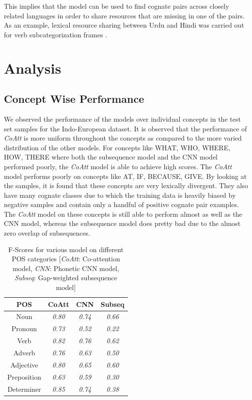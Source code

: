 \documentclass[11pt,letterpaper]{article}
\begin{document}
This implies that the model can be used to find cognate pairs across closely related languages in order to share resources that are missing in one of the pairs. As an example, lexical resource sharing between Urdu and Hindi was carried out for verb subcategorization frames \cite{bhat-EtAl:2014:LT4CloseLang}.

\section{Analysis}

\subsection{Concept Wise Performance}

We observed the performance of the models over individual concepts in the test set samples for the Indo-European dataset. It is observed that the performance of \textit{CoAtt} is more uniform throughout the concepts as compared to the more varied distribution of the other models. For concepts like WHAT, WHO, WHERE, HOW, THERE where both the subsequence model and the CNN model performed poorly, the \textit{CoAtt} model is able to achieve high scores. The \textit{CoAtt} model performs poorly on concepts like AT, IF, BECAUSE, GIVE. By looking at the samples, it is found that these concepts are very lexically divergent. They also have many cognate classes due to which the training data is heavily biased by negative samples and contain only a handful of positive cognate pair examples. The \textit{CoAtt} model on these concepts is still able to perform almost as well as the CNN model, whereas the subsequence model does pretty bad due to the almost zero overlap of subsequences.

\begin{table}[h]
\centering
\begin{tabular}{|c|c|c|c|}
\hline
\textbf{POS} & \textbf{CoAtt} & \textbf{CNN} & \textbf{Subseq} \\ \hline
Noun             & \textit{0.80}  & \textit{0.74}  & \textit{0.66}   \\
Pronoun          & \textit{0.73}  & \textit{0.52}  & \textit{0.22}   \\
Verb             & \textit{0.82}  & \textit{0.76}  & \textit{0.62}   \\
Adverb           & \textit{0.76}  & \textit{0.63}  & \textit{0.50}   \\
Adjective        & \textit{0.80}  & \textit{0.65}  & \textit{0.60}   \\
Preposition      & \textit{0.63}  & \textit{0.59}  & \textit{0.30}   \\
Determiner       & \textit{0.85}  & \textit{0.74}  & \textit{0.38}   \\ \hline
\end{tabular}
\caption{F-Scores for various model on different POS categories [\textit{CoAtt}: Co-attention model, \textit{CNN}: Phonetic CNN model, \textit{Subseq}: Gap-weighted subsequence model] }
\end{table}
\end{document}
